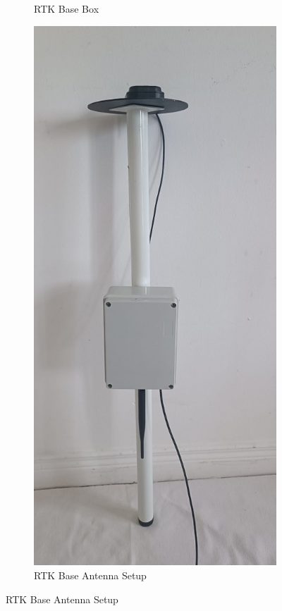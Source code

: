 \begin{figure}[H]
\begin{subfigure}{0.35\linewidth}
        \caption{RTK Base Box}
        \label{fig:base_box}
    \end{subfigure}
    \begin{subfigure}{0.35\linewidth}
        \centering
        \includegraphics[height=0.35\textheight]{figures/base_antenna.png}
        \caption{RTK Base Antenna Setup}
        \label{fig:base_antenna}
    \end{subfigure}
\end{figure}

